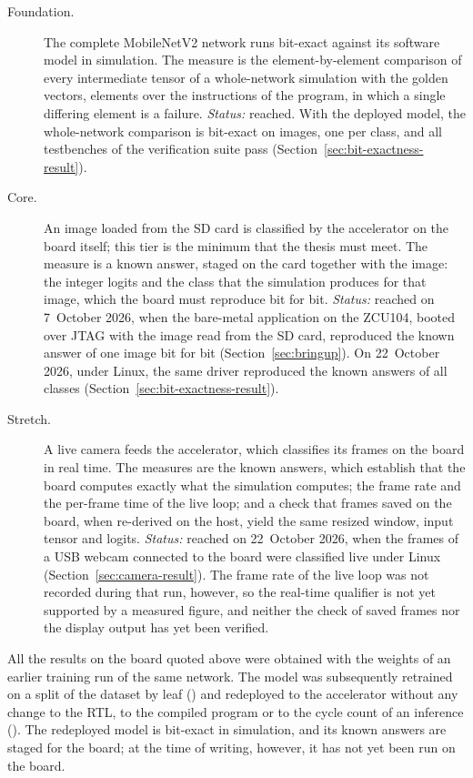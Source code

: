 \begin{description}
  \item[Foundation.] The complete MobileNetV2 network runs bit-exact against
    its software model in simulation. The measure is the element-by-element
    comparison of every intermediate tensor of a whole-network simulation with
    the golden vectors, \thElements{} elements over the \thInstructions{}
    instructions of the program, in which a single differing element is a
    failure. \emph{Status:} reached. With the deployed model, the
    whole-network comparison is bit-exact on \thImagesVerified{} images, one
    per class, and all \thTestbenches{} testbenches of the verification suite
    pass (Section~\ref{sec:bit-exactness-result}).
  \item[Core.] An image loaded from the SD card is classified by the
    accelerator on the board itself; this tier is the minimum that the thesis
    must meet. The measure is a known answer, staged on the card together
    with the image: the \thClasses{} integer logits and the class that the
    simulation produces for that image, which the board must reproduce bit for
    bit. \emph{Status:} reached on 7~October 2026, when the bare-metal
    application on the ZCU104, booted over JTAG with the image read from the
    SD card, reproduced the known answer of one image bit for bit
    (Section~\ref{sec:bringup}). On 22~October 2026, under Linux, the same
    driver reproduced the known answers of all \thClasses{} classes
    (Section~\ref{sec:bit-exactness-result}).
  \item[Stretch.] A live camera feeds the accelerator, which classifies its
    frames on the board in real time. The measures are the known answers,
    which establish that the board computes exactly what the simulation
    computes; the frame rate and the per-frame time of the live loop; and a
    check that frames saved on the board, when re-derived on the host, yield
    the same resized window, input tensor and logits. \emph{Status:} reached
    on 22~October 2026, when the frames of a USB webcam connected to the
    board were classified live under Linux
    (Section~\ref{sec:camera-result}). The frame rate of the live loop was
    not recorded during that run, however, so the real-time qualifier is not
    yet supported by a measured figure, and neither the check of saved frames
    nor the display output has yet been verified.
\end{description}

All the results on the board quoted above were obtained with the weights of
an earlier training run of the same network. The model was subsequently
retrained on a split of the dataset by leaf () and redeployed to the
accelerator without any change to the RTL, to the compiled program or to the
cycle count of an inference (). The redeployed model is bit-exact in
simulation, and its known answers are staged for the board; at the time of
writing, however, it has not yet been run on the board.

